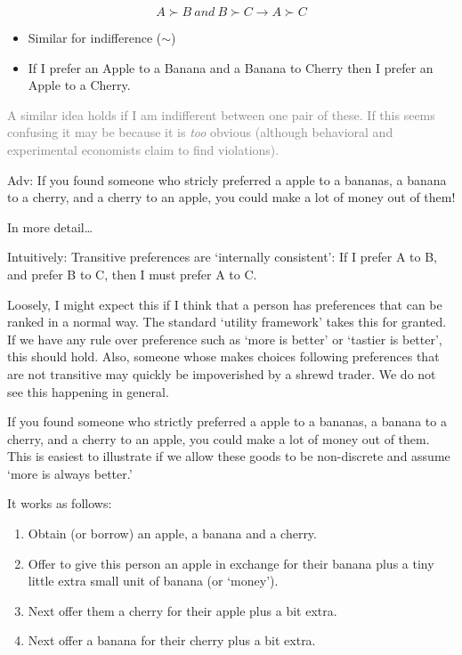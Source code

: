 \documentclass[]{article}
\begin{document}
\[ A \succ B \: and \: B \succ C \rightarrow A \succ C \]

\begin{itemize}
\item
  Similar for indifference (\(\sim\))
\item
  If I prefer an Apple to a Banana and a Banana to Cherry then I prefer
  an Apple to a Cherry.
\end{itemize}

\textcolor{gray}{A similar idea holds if I am indifferent between one pair of these. If this seems confusing it may be because it is \emph{too} obvious (although behavioral and experimental economists claim to find violations).}

\textcolor{RawSienna}{Adv: If you found someone who stricly preferred a apple to a bananas, a banana to a cherry, and a cherry to an apple,  you could make a lot of money out of them!}

\bigskip

In more detail\ldots{}

Intuitively: Transitive preferences are `internally consistent': If I
prefer A to B, and prefer B to C, then I must prefer A to C.

\bigskip

Loosely, I might expect this if I think that a person has preferences
that can be ranked in a normal way. The standard `utility framework'
takes this for granted. If we have any rule over preference such as
`more is better' or `tastier is better', this should hold. Also, someone
whose makes choices following preferences that are not transitive may
quickly be impoverished by a shrewd trader. We do not see this happening
in general.

\bigskip

If you found someone who strictly preferred a apple to a bananas, a
banana to a cherry, and a cherry to an apple, you could make a lot of
money out of them. This is easiest to illustrate if we allow these goods
to be non-discrete and assume `more is always better.'

\bigskip

It works as follows:

\begin{enumerate}
\def\labelenumi{\arabic{enumi}.}
\setcounter{enumi}{-1}
\item
  Obtain (or borrow) an apple, a banana and a cherry.
\item
  Offer to give this person an apple in exchange for their banana plus a
  tiny little extra small unit of banana (or `money').
\item
  Next offer them a cherry for their apple plus a bit extra.
\item
  Next offer a banana for their cherry plus a bit extra.
\end{enumerate}
\end{document}
